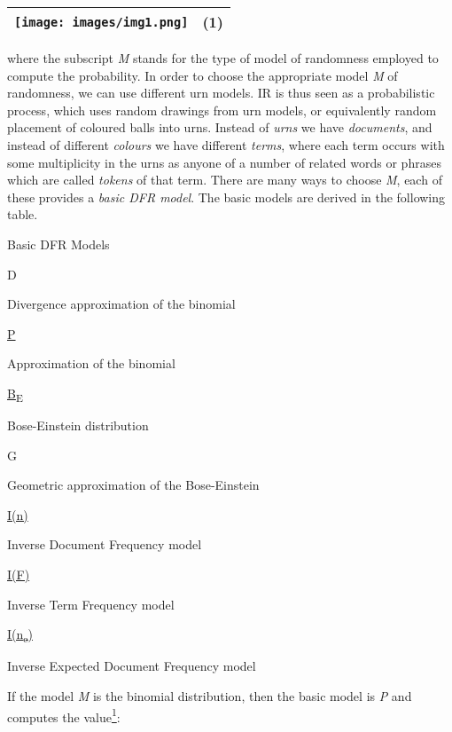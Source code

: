 \href{}{}

\begin{longtable}[]{@{}ll@{}}
\toprule
\texttt{[image: images/img1.png]} &
(1)\tabularnewline
\bottomrule
\end{longtable}

where the subscript \emph{M} stands for the type of model of randomness
employed to compute the probability. In order to choose the appropriate
model \emph{M} of randomness, we can use different urn models. IR is
thus seen as a probabilistic process, which uses random drawings from
urn models, or equivalently random placement of coloured balls into
urns. Instead of \emph{urns} we have \emph{documents}, and instead of
different \emph{colours} we have different \emph{terms}, where each term
occurs with some multiplicity in the urns as anyone of a number of
related words or phrases which are called \emph{tokens} of that term.
There are many ways to choose \emph{M}, each of these provides a
\emph{basic DFR model}. The basic models are derived in the following
table.

Basic DFR Models

D

Divergence approximation of the binomial

\href{javadoc/org/terrier/matching/models/basicmodel/P.html}{P}

Approximation of the binomial

\href{javadoc/org/terrier/matching/models/basicmodel/B.html}{B\textsubscript{E}}

Bose-Einstein distribution

G

Geometric approximation of the Bose-Einstein

\href{javadoc/org/terrier/matching/models/basicmodel/In.html}{I(n)}

Inverse Document Frequency model

\href{javadoc/org/terrier/matching/models/basicmodel/IF.html}{I(F)}

Inverse Term Frequency model

\href{javadoc/org/terrier/matching/models/basicmodel/In_exp.html}{I(n\textsubscript{e})}

Inverse Expected Document Frequency model

If the model \emph{M} is the binomial distribution, then the basic model
is \emph{P} and computes the
value\protect\hyperlink{footnote1}{\textsuperscript{1}}:

\href{}{}

